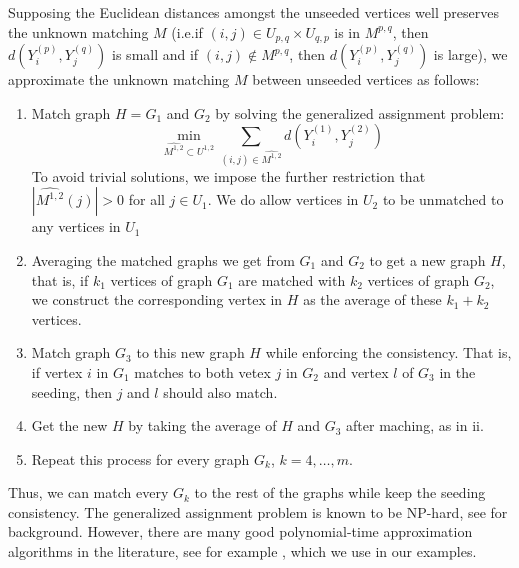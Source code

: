 \documentclass[12pt]{article}
\numberwithin{equation}{section}
\theoremstyle{definition}
\begin{document}
Supposing the Euclidean distances amongst the unseeded vertices well
preserves the unknown matching $M$ (i.e.\@ if $(i,j)\in U_{p,q} \times
U_{q,p}$ is in $M^{p,q}$, then $d(Y^{(p)}_i,Y^{(q)}_j)$ is small and if
$(i,j)\notin M^{p,q}$, then $d(Y^{(p)}_i,Y^{(q)}_j)$ is large), we
approximate the unknown matching $M$ between unseeded vertices as
follows:
{\it

\begin{enumerate}

\item  Match graph $H=G_1$ and $G_2$ by solving the generalized assignment problem:
\begin{equation}
\min_{\widehat{M^{1,2}}\subset U^{1,2}}\sum_{(i,j)\in \widehat{M^{1,2}}} d(Y^{(1)}_i,Y^{(2)}_j)
\end{equation}
To avoid trivial solutions, we impose the further restriction that $|\widehat{M^{1,2}}(j)|>0$ for all $j\in U_1$.  We do allow vertices in $U_2$ to be unmatched to any vertices in $U_1$

\item  Averaging the matched graphs we get from $G_1$ and $G_2$ to get a
    new graph $H$, that is, if $k_1$ vertices of graph $G_1$ are matched
    with $k_2$ vertices of graph $G_2$, we construct the corresponding
    vertex in $H$ as the average of these $k_1 + k_2$ vertices.

\item  Match graph $G_3$ to this new graph $H$ while enforcing the consistency. That is, if vertex $i$ in $G_1$ matches to both vetex $j$ in $G_2$ and vertex $l$ of $G_3$ in the seeding, then $j$ and $l$ should also match.

\item  Get the new $H$ by taking the average of $H$ and $G_3$ after maching, as in ii.

\item  Repeat this process for every graph $G_k$, $k=4, \ldots, m.$
\end{enumerate}
}

Thus, we can match every $G_k$ to the rest of the graphs while keep the
seeding consistency. The generalized assignment problem is known to be
NP-hard, see \cite{gap2} for background.  However, there are many good
polynomial-time approximation algorithms in the literature, see for example
\cite{gap1}, which we use in our examples.

\end{document}
